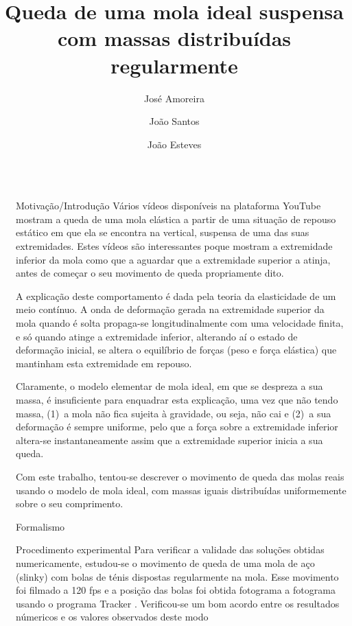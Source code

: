 \documentclass[final]{beamer}
\title{Queda de uma mola ideal suspensa com massas distribuídas regularmente}
\author{José Amoreira \inst{1,2,3} \and João Santos \inst{2} \and João Esteves \inst{2}}
\institute[]{\inst{1} Laboratório de Instrumentação e Física Experimental de Partículas \and  \inst{2}Universidade da Beira Interior  \samelineand \inst{3} Centro de Matemática e Aplicações}
\newlength{\sepwidth}
\newlength{\colwidth}
\newcommand{\separatorcolumn}{\begin{column}{\sepwidth}\end{column}}
\begin{document}
\begin{frame}[t]
\begin{columns}[t]
\separatorcolumn
\begin{column}{\colwidth}
\begin{exampleblock}{Motivação/Introdução}
	Vários vídeos disponíveis na plataforma YouTube mostram a queda de uma mola
	elástica a partir de uma situação de repouso estático em que ela se encontra na
	vertical, suspensa de uma das suas extremidades. Estes vídeos são interessantes
	poque mostram a extremidade inferior da mola como que a aguardar que a
	extremidade superior a atinja, antes de começar o seu movimento de queda
	propriamente dito. 
	
	A explicação deste comportamento é dada pela teoria da elasticidade de um meio
	contínuo. A onda de deformação gerada na extremidade superior da mola quando é
	solta propaga-se longitudinalmente com uma velocidade finita, e só quando atinge
	a extremidade inferior, alterando aí o estado de deformação inicial, se altera o
	equilíbrio de forças (peso e força elástica) que mantinham esta extremidade em
	repouso.
	
	Claramente, o modelo elementar de mola ideal, em que se despreza a sua massa, é
	insuficiente para enquadrar esta explicação, uma vez que não tendo massa, (1)~a
	mola não fica sujeita à gravidade, ou seja, não cai e (2)~a sua deformação é
	sempre uniforme, pelo que a força sobre a extremidade inferior altera-se
	instantaneamente assim que a extremidade superior inicia a sua queda. 
	
	Com este trabalho, tentou-se descrever o movimento de queda das molas reais
	usando o modelo de mola ideal, com massas iguais distribuídas uniformemente
	sobre o seu comprimento.
\end{exampleblock}
\begin{block}{Formalismo}
	\vspace{1cm}
	
\end{block}
\begin{block}{Procedimento experimental}
	Para verificar a validade das soluções obtidas numericamente, estudou-se o movimento de queda de uma mola de aço (slinky) com bolas de ténis dispostas regularmente na mola. Esse movimento foi filmado a 120 fps e a posição das bolas foi obtida fotograma a fotograma usando o programa Tracker \cite{Tracker}. Verificou-se um bom acordo entre os resultados númericos e os valores observados deste modo 
	

\end{block}
\end{column}
\end{columns}
\end{frame}
\end{document}
